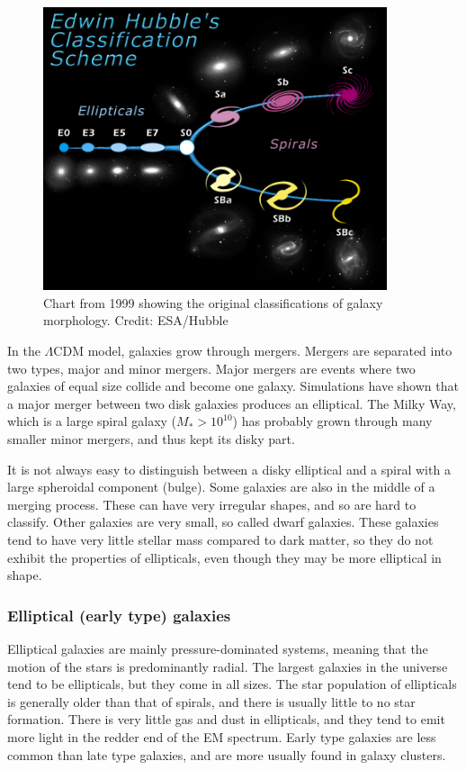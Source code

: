 \begin{figure}
    \centering
    \includegraphics[width=0.9\textwidth]{images/hubble.jpg}
    \caption{Chart from 1999 showing the original classifications of galaxy morphology. Credit: ESA/Hubble}
    \label{hubble}
\end{figure}

In the $\Lambda$CDM model, galaxies grow through mergers. Mergers are separated into two types, major and minor mergers.  Major mergers are events where two galaxies of equal size collide and become one galaxy. Simulations have shown that a major merger between two disk galaxies produces an elliptical. The Milky Way, which is a large spiral galaxy ($M_*>10^{10}$) has probably grown through many smaller minor mergers, and thus kept its disky part.

It is not always easy to distinguish between a disky elliptical and a spiral with a large spheroidal component (bulge). Some galaxies are also in the middle of a merging process. These can have very irregular shapes, and so are hard to classify. Other galaxies are very small, so called dwarf galaxies. These galaxies tend to have very little stellar mass compared to dark matter, so they do not exhibit the properties of ellipticals, even though they may be more elliptical in shape.

\subsubsection{Elliptical (early type) galaxies}
Elliptical galaxies are mainly pressure-dominated systems, meaning that the motion of the stars is predominantly radial. The largest galaxies in the universe tend to be ellipticals, but they come in all sizes. The star population of ellipticals is generally older than that of spirals, and there is usually little to no star formation. There is very little gas and dust in ellipticals, and they tend to emit more light in the redder end of the EM spectrum. Early type galaxies are less common than late type galaxies, and are more usually found in galaxy clusters.

